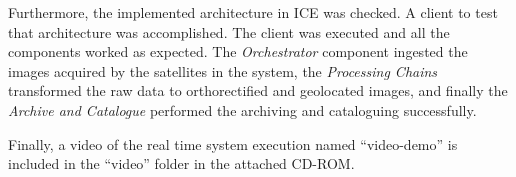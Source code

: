 Furthermore, the implemented architecture in ICE was checked. A client
to test that architecture was accomplished. The client was executed and all the
components worked as expected. The  \emph{Orchestrator}
component ingested the images acquired by the satellites in the system, the
\emph{Processing Chains} transformed the raw data to orthorectified and
geolocated images, and finally the \emph{Archive and Catalogue} performed the
archiving and cataloguing successfully. 

Finally, a video of the real time system execution named
``video-demo'' is included in the ``video''
folder in the attached CD-ROM.

